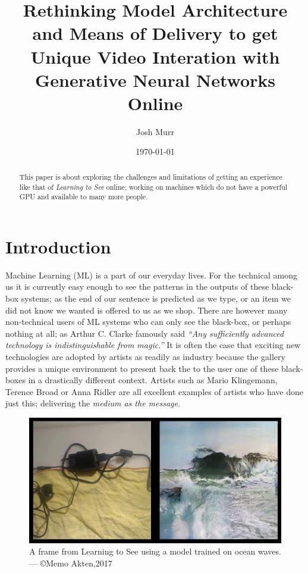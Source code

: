 \documentclass{article}
\title{Rethinking Model Architecture and Means of Delivery to get Unique Video Interation with Generative Neural Networks Online}
\date{\today}
\author{Josh Murr}
\begin{document}
\maketitle

\begin{abstract}
	This paper is about exploring the challenges and limitations of getting an experience like that of \textit{Learning to See} online; working on machines which do not have a powerful GPU and available to many more people.
\end{abstract}

\section{Introduction}
Machine Learning (ML) is a part of our everyday lives. For the technical among us it is currently easy enough to see the patterns in the outputs of these black-box systems; as the end of our sentence is predicted as we type, or an item we did not know we wanted is offered to us as we shop. There are however many non-technical users of ML systems who can only see the black-box, or perhaps nothing at all; as Arthur C. Clarke famously said \textit{``Any sufficiently advanced technology is indistinguishable from magic.''}\cite{toffler_1972} It is often the case that exciting new technologies are adopted by artists as readily as industry because the gallery provides a unique environment to present back the to the user one of these black-boxes in a drastically different context. Artists such as Mario Klingemann\cite{mario_klingemann}, Terence Broad\cite{terry_broad} or Anna Ridler\cite{anna_ridler} are all excellent examples of artists who have done just this; delivering the \textit{medium as the message}.

\begin{figure}
	\centering
	\includegraphics[scale=0.3]{lts_still}
	\caption{A frame from Learning to See using a model trained on ocean waves. --- \copyright Memo Akten,2017}
\end{figure}
\end{document}
